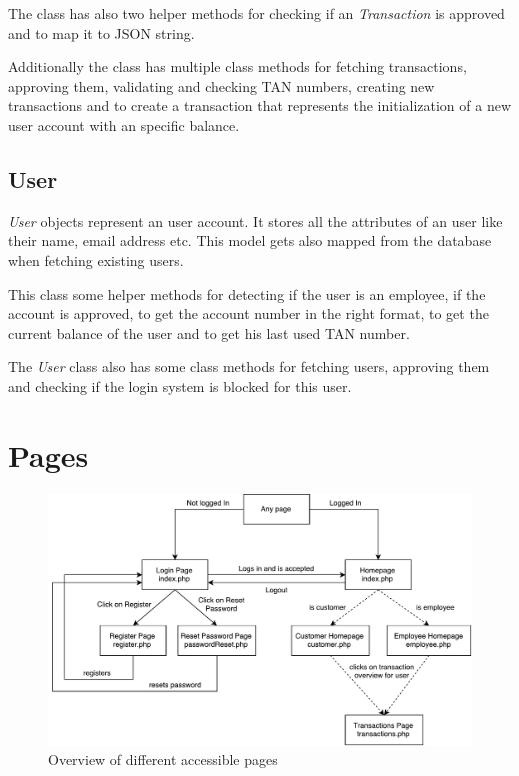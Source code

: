 \documentclass[headsepline,footsepline,footinclude=false,oneside,fontsize=11pt,paper=a4,listof=totoc,bibliography=totoc]{scrbook} %
\begin{document}
The class has also two helper methods for checking if an \textit{Transaction} is approved and to map it to JSON string.

Additionally the class has multiple class methods for fetching transactions, approving them, validating and checking TAN numbers, creating new transactions and to create a transaction that represents the initialization of a new user account with an specific balance.

\subsection{User}

\textit{User} objects represent an user account. It stores all the attributes of an user like their name, email address etc. This model gets also mapped from the database when fetching existing users.

This class some helper methods for detecting if the user is an employee, if the account is approved, to get the account number in the right format, to get the current balance of the user and to get his last used TAN number.

The \textit{User} class also has some class methods for fetching users, approving them and checking if the login system is blocked for this user.

\pagebreak

\section{Pages}

\begin{figure}[!ht]
	\centering
	\includegraphics[scale=0.6]{figures/pages.pdf}
	\caption{Overview of different accessible pages}
	\label{pages}
\end{figure}
\end{document}
